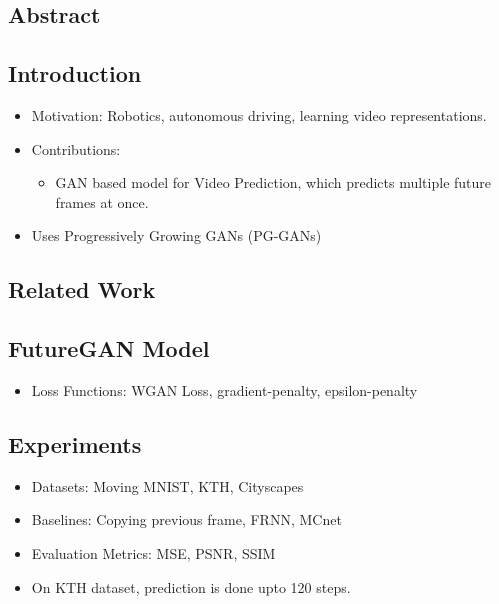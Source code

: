 \documentclass{article}
\begin{document}
    \subsection*{Abstract}

    \subsection{Introduction}\label{subsec:FutureGAN_Anticipating_the_Future_Frames_of_Video_Sequences_using_Spatio_Temporal_3d_Convolutions_in_Progressively_Growing_GANs:introduction}
    \begin{itemize}
        \item Motivation: Robotics, autonomous driving, learning video representations.
        \item Contributions:
        \begin{itemize}
            \item GAN based model for Video Prediction, which predicts multiple future frames at once.
        \end{itemize}
        \item Uses Progressively Growing GANs (PG-GANs)
    \end{itemize}

    \subsection{Related Work}\label{subsec:FutureGAN_Anticipating_the_Future_Frames_of_Video_Sequences_using_Spatio_Temporal_3d_Convolutions_in_Progressively_Growing_GANs:related-work}

    \subsection{FutureGAN Model}\label{subsec:FutureGAN_Anticipating_the_Future_Frames_of_Video_Sequences_using_Spatio_Temporal_3d_Convolutions_in_Progressively_Growing_GANs:futuregan-model}
    \begin{itemize}
        \item Loss Functions: WGAN Loss, gradient-penalty, epsilon-penalty
    \end{itemize}

    \subsection{Experiments}\label{subsec:FutureGAN_Anticipating_the_Future_Frames_of_Video_Sequences_using_Spatio_Temporal_3d_Convolutions_in_Progressively_Growing_GANs:experiments}
    \begin{itemize}
        \item Datasets: Moving MNIST, KTH, Cityscapes
        \item Baselines: Copying previous frame, FRNN, MCnet
        \item Evaluation Metrics: MSE, PSNR, SSIM
        \item On KTH dataset, prediction is done upto 120 steps.
    \end{itemize}
    \newpage
\end{document}
